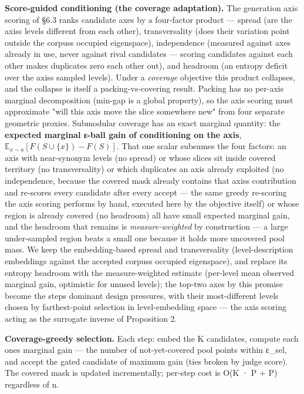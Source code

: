 \documentclass[
  10pt,
]{article}
\theoremstyle{plain}
\theoremstyle{definition}
\begin{document}
\textbf{Score-guided conditioning (the coverage adaptation).} The
generation axis scoring of §6.3 ranks candidate axes by a four-factor
product --- spread (are the axis\textquotesingle s levels different from
each other), transversality (does their variation point outside the
corpus\textquotesingle s occupied eigenspace), independence (measured
against axes already in use, never against rival candidates --- scoring
candidates against each other makes duplicates zero each other out), and
headroom (an entropy deficit over the axis\textquotesingle s sampled
levels). Under a \emph{coverage} objective this product collapses, and
the collapse is itself a packing-vs-covering result. Packing has no
per-axis marginal decomposition (min-gap is a global property), so the
axis scoring must approximate "will this axis move the slice somewhere
new" from four separate geometric proxies. Submodular coverage has an
exact marginal quantity: the \textbf{expected marginal ε-ball gain of
conditioning on the axis},
\(\mathbb{E}_{x \sim a}[F(S \cup \{x\}) - F(S)]\). That one scalar
subsumes the four factors: an axis with near-synonym levels (no spread)
or whose slices sit inside covered territory (no transversality) or
which duplicates an axis already exploited (no independence, because the
covered mask already contains that axis\textquotesingle s contribution
and re-scores every candidate after every accept --- the same greedy
re-scoring the axis scoring performs by hand, executed here by the
objective itself) or whose region is already covered (no headroom) all
have small expected marginal gain, and the headroom that remains is
\emph{measure-weighted} by construction --- a large under-sampled region
beats a small one because it holds more uncovered pool mass. We keep the
embedding-based spread and transversality (level-description embeddings
against the accepted corpus\textquotesingle s occupied eigenspace), and
replace its entropy headroom with the measure-weighted estimate
(per-level mean observed marginal gain, optimistic for unused levels);
the top-two axes by this promise become the step\textquotesingle s
dominant design pressures, with their most-different levels chosen by
farthest-point selection in level-embedding space --- the axis scoring
acting as the surrogate inverse of Proposition 2.

\textbf{Coverage-greedy selection.} Each step: embed the K candidates,
compute each one\textquotesingle s marginal gain --- the number of
not-yet-covered pool points within ε\_sel, and accept the gated
candidate of maximum gain (ties broken by judge score). The covered mask
is updated incrementally; per-step cost is O(K · P + P) regardless of n.
\end{document}
